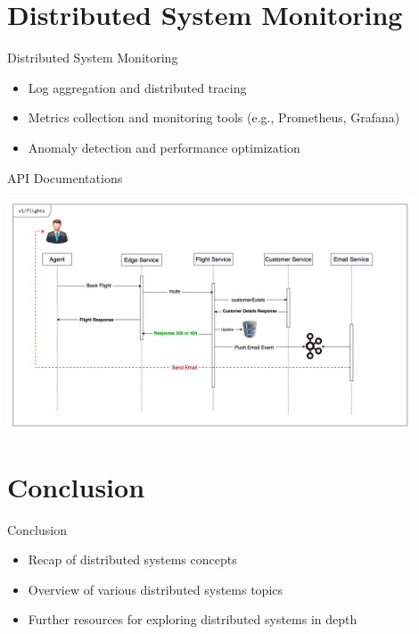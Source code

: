 \documentclass{beamer}
\begin{document}
\section{Distributed System Monitoring}
\begin{frame}{Distributed System Monitoring}
  \begin{itemize}
    \item Log aggregation and distributed tracing
    \item Metrics collection and monitoring tools (e.g., Prometheus, Grafana)
    \item Anomaly detection and performance optimization
  \end{itemize}
\end{frame}

\begin{frame}{API Documentations}
  \begin{center}
    \includegraphics[width=0.9\textwidth]{img/sd.png} 
  \end{center} 
\end{frame}

\section{Conclusion}
\begin{frame}{Conclusion}
  \begin{itemize}
    \item Recap of distributed systems concepts
    \item Overview of various distributed systems topics
    \item Further resources for exploring distributed systems in depth
  \end{itemize}
\end{frame}
\end{document}
